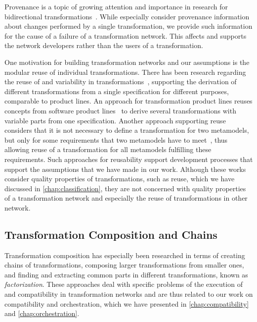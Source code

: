 Provenance is a topic of growing attention and importance in research for bidirectional transformations~\cite{cleve2019dagstuhl,anjorin2019provenance-tapp}.
While \textcite{anjorin2019provenance-tapp} especially consider provenance information about changes performed by a single transformation, we provide such information for the cause of a failure of a transformation network.
This affects and supports the network developers rather than the users of a transformation.

One motivation for building transformation networks and our assumptions is the modular reuse of individual transformations.
There has been research regarding the reuse of and variability in transformations~\cite{bruel2020transformationReuse-SoSym}, supporting the derivation of different transformations from a single specification for different purposes, comparable to product lines.
An approach for transformation product lines reuses concepts from software product lines~\cite{delara2018transformationProductLines-Models} to derive several transformations with variable parts from one specification.
Another approach supporting reuse considers that it is not necessary to define a transformation for two metamodels, but only for some requirements that two metamodels have to meet~\cite{delara2019transformationResue-TOSEM}, thus allowing reuse of a transformation for all metamodels fulfilling these requirements.
Such approaches for reusability support development processes that support the assumptions that we have made in our work.
Although these works consider quality properties of transformations, such as reuse, which we have discussed in \autoref{chap:classification}, they are not concerned with quality properties of a transformation network and especially the reuse of transformations in other network.


\subsection{Transformation Composition and Chains}

Transformation composition has especially been researched in terms of creating chains of transformations, composing larger transformations from smaller ones, and finding and extracting common parts in different transformations, known as \emph{factorization}.
These approaches deal with specific problems of the execution of and compatibility in transformation networks and are thus related to our work on compatibility and orchestration, which we have presented in \autoref{chap:compatibility} and \autoref{chap:orchestration}.

